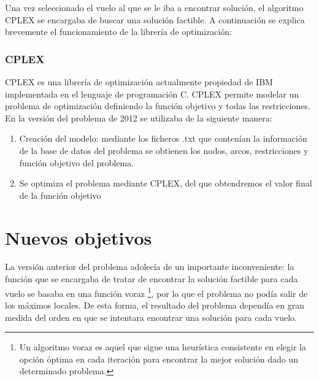 Una vez seleccionado el vuelo al que se le iba a encontrar solución, el algoritmo CPLEX se encargaba de buscar una solución factible. A continuación se explica brevemente el funcionamiento de la librería de optimización:

\subsubsection{CPLEX}
CPLEX es una librería de optimización actualmente propiedad de IBM implementada en el lenguaje de programación C. CPLEX permite modelar un problema de optimización definiendo la función objetivo y todas las restricciones.\\
En la versión del problema de 2012 se utilizaba de la siguiente manera:
\begin{enumerate}
	\item Creación del modelo: mediante los ficheros .txt que contenían la información de la base de datos del problema se obtienen los nodos, arcos, restricciones y función objetivo del problema.
	\item Se optimiza el problema mediante CPLEX, del que obtendremos el valor final de la función objetivo
\end{enumerate}



\section{Nuevos objetivos}
La versión anterior del problema adolecía de un importante inconveniente: la función que se encargaba de tratar de encontrar la solución factible para cada vuelo se basaba en una función voraz \footnote{Un algoritmo voraz es aquel que sigue una heurística consistente en elegir la opción óptima en cada iteración para encontrar la mejor solución dado un determinado problema.}, por lo que el problema no podía salir de los máximos locales. De esta forma, el resultado del problema dependía en gran medida del orden en que se intentara encontrar una solución para cada vuelo.\\



